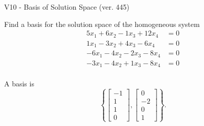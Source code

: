 \begin{exercise}
  \begin{exerciseTitle}V10 - Basis of Solution Space (ver. 445)\end{exerciseTitle}
  \begin{exerciseStatement}
    Find a basis for the solution space of the homogeneous system 
\begin{align*}
 5 x_ 1 + 6 x_ 2 -1 x_ 3 + 12 x_ 4 &= 0  \\ 
  1 x_ 1 -3 x_ 2 + 4 x_ 3 -6 x_ 4 &= 0  \\ 
  -6 x_ 1 -4 x_ 2 -2 x_ 3 -8 x_ 4 &= 0  \\ 
  -3 x_ 1 -4 x_ 2 + 1 x_ 3 -8 x_ 4 &= 0  \\ 
 \end{align*}


 
  \end{exerciseStatement}

  \begin{exerciseAnswer}
   A basis is   
\[\left\{\left[\begin{array}{c}
-1 \\
1 \\
1 \\
0
\end{array}\right] , \left[\begin{array}{c}
0 \\
-2 \\
0 \\
1
\end{array}\right]\right\}.\]

  


  \end{exerciseAnswer}
\end{exercise}